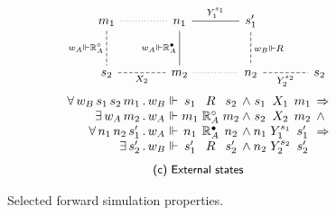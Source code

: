 \documentclass[sigplan,10pt,review]{acmart}
\newcommand{\que}{\circ}
\newcommand{\ans}{\bullet}
\begin{document}
\begin{figure}
\[\begin{array}{c}
\begin{tikzcd}[sep=large,baseline=-3pt]
        m_1 \ar[r, dotted, dash] \ar[d, "w_A \Vdash \mathbb{R}_A^\que"', dash, dashed] &
        n_1 \ar[r, "Y_1^{s_1}", dash] \ar[d, "w_A \Vdash \mathbb{R}_A^\ans"', dash] &
        s_1' \ar[d, "w_B \Vdash R", dash, dashed]
        \\
        s_2 \ar[r, "X_2"', dash, dashed] &
        m_2 \ar[r, dotted, dash] &
        n_2 \ar[r, "Y_2^{s_2}"', dash, dashed] &
        s_2
      \end{tikzcd}
      \vspace{1ex} \\
      \begin{array}{
          r @{\,.\,} l @{{} \Vdash {}} c@{}c@{}c @{\:\wedge\:}
                                    c@{}c@{}c @{\:\:} l}
        \forall \, w_B \, s_1 \, s_2 \, m_1 & w_B & s_1 & {}\mathrel{R}{} & s_2 &
                        s_1 & {}\mathrel{X_1}{} & m_1 & \Rightarrow \\
        \exists \, w_A \, m_2 & w_A & m_1 & {}\mathrel{\mathbb{R}_A^\que}{} & m_2 &
                        s_2 & {}\mathrel{X_2}{} & m_2 & \wedge \\
        \forall \, n_1 \, n_2 \, s_1' & w_A & n_1 & {}\mathrel{\mathbb{R}_A^\ans}{} & n_2 &
                        n_1 & {}\mathrel{Y_1^{s_1}}{} & s_1' & \Rightarrow \\
        \exists \, s_2' & w_B & s_1' & {}\mathrel{R}{} & s_2' &
                        n_2 & {}\mathrel{Y_2^{s_2}}{} & s_2' &
      \end{array}
      \vspace{1.5ex} \\
      \small \textsf{(c) External states}
    \end{array}
  \]
  \caption{Selected forward simulation properties.}
  \label{fig:fsim}
\end{figure}
\end{document}
